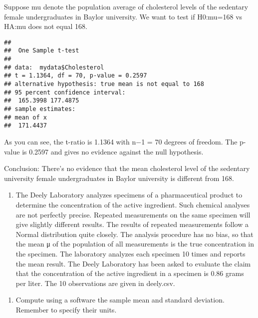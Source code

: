 \documentclass[]{article}
\newenvironment{Shaded}{\begin{snugshade}}{\end{snugshade}}
\newcommand{\KeywordTok}[1]{\textcolor[rgb]{0.13,0.29,0.53}{\textbf{#1}}}
\newcommand{\DataTypeTok}[1]{\textcolor[rgb]{0.13,0.29,0.53}{#1}}
\newcommand{\DecValTok}[1]{\textcolor[rgb]{0.00,0.00,0.81}{#1}}
\newcommand{\OperatorTok}[1]{\textcolor[rgb]{0.81,0.36,0.00}{\textbf{#1}}}
\newcommand{\NormalTok}[1]{#1}
\providecommand{\tightlist}{%
  \setlength{\itemsep}{0pt}\setlength{\parskip}{0pt}}
\begin{document}
Suppose mu denote the population average of cholesterol levels of the
sedentary female undergraduates in Baylor university. We want to test if
H0:mu=168 vs HA:mu does not equal 168.

\begin{Shaded}
\end{Shaded}

\begin{verbatim}
## 
##  One Sample t-test
## 
## data:  mydata$Cholesterol
## t = 1.1364, df = 70, p-value = 0.2597
## alternative hypothesis: true mean is not equal to 168
## 95 percent confidence interval:
##  165.3998 177.4875
## sample estimates:
## mean of x 
##  171.4437
\end{verbatim}

As you can see, the t-ratio is 1.1364 with n−1 = 70 degrees of freedom.
The p-value is 0.2597 and gives no evidence against the null hypothesis.

Conclusion: There's no evidence that the mean cholesterol level of the
sedentary university female undergraduates in Baylor university is
different from 168.

\begin{enumerate}
\def\labelenumi{\arabic{enumi}.}
\setcounter{enumi}{2}
\tightlist
\item
  The Deely Laboratory analyzes specimens of a pharmaceutical product to
  determine the concentration of the active ingredient. Such chemical
  analyses are not perfectly precise. Repeated measurements on the same
  specimen will give slightly different results. The results of repeated
  measurements follow a Normal distribution quite closely. The analysis
  procedure has no bias, so that the mean μ of the population of all
  measurements is the true concentration in the specimen. The laboratory
  analyzes each specimen 10 times and reports the mean result. The Deely
  Laboratory has been asked to evaluate the claim that the concentration
  of the active ingredient in a specimen is 0.86 grams per liter. The 10
  observations are given in deely.csv.
\end{enumerate}

\begin{enumerate}
\def\labelenumi{\alph{enumi})}
\tightlist
\item
  Compute using a software the sample mean and standard deviation.
  Remember to specify their units.
\end{enumerate}
\end{document}
